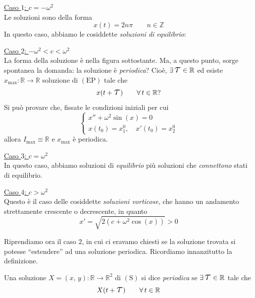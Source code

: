 \underline{Caso $1$: $c = -\omega^2$}\\
Le soluzioni sono della forma
$$
x(t) = 2n\pi \qquad n \in \mathbb{Z}
$$
In questo caso, abbiamo le cosiddette \emph{soluzioni di equilibrio}:
\begin{center}
\def\svgwidth{8cm}

\end{center}

\underline{Caso $2$: $-\omega^2 < c < \omega^2$}\\
La forma della soluzione è nella figura sottostante. Ma, a questo punto, sorge spontanea la domanda: la soluzione è \emph{periodica}? Cioè, $\exists \, \text{\LARGE $\tau$} \in \mathbb{R}$ ed esiste $x_{\max} : \mathbb{R} \longrightarrow \mathbb{R}$ soluzione di $\mathrm{(EP)}$ tale che
$$
x(t+\text{\LARGE $\tau$}) \qquad \forall \, t \in \mathbb{R}?
$$
Si può provare che, fissate le condizioni iniziali per cui
$$
\begin{cases}
x'' + \omega^2\sin(x) = 0\\
x(t_0) = x_1^0, \quad x'(t_0) = x_2^0
\end{cases}
$$
allora $I_{\max} \equiv \mathbb{R}$ e $x_{\max}$ è periodica.
\begin{center}
\def\svgwidth{8cm}

\end{center}

\underline{Caso $3$: $c = \omega^2$}\\
In questo caso, abbiamo soluzioni di \emph{equilibrio} più soluzioni che \emph{connettono} stati di equilibrio.
\begin{center}
\def\svgwidth{8cm}

\end{center}

\underline{Caso $4$: $c > \omega^2$}\\
Questo è il caso delle cosiddette \emph{soluzioni vorticose}, che hanno un andamento strettamente crescente o decrescente, in quanto
$$
x' = \sqrt{2(c+\omega^2\cos(x))} > 0
$$
\begin{center}
\def\svgwidth{8cm}

\end{center}

Riprendiamo ora il caso $2$, in cui ci eravamo chiesti se la soluzione trovata si potesse ``estendere'' ad una soluzione periodica. Ricordiamo innanzitutto la definizione.

\begin{definition}
Una soluzione $X = (x,\,y) : \mathbb{R} \longrightarrow \mathbb{R}^2$ di $\mathrm{(S)}$ si dice \emph{periodica} se $\exists \, \text{\LARGE $\tau$} \in \mathbb{R}$  tale che
$$
X(t+\text{\LARGE $\tau$}) \qquad \forall \, t \in \mathbb{R}
$$
\end{definition}

